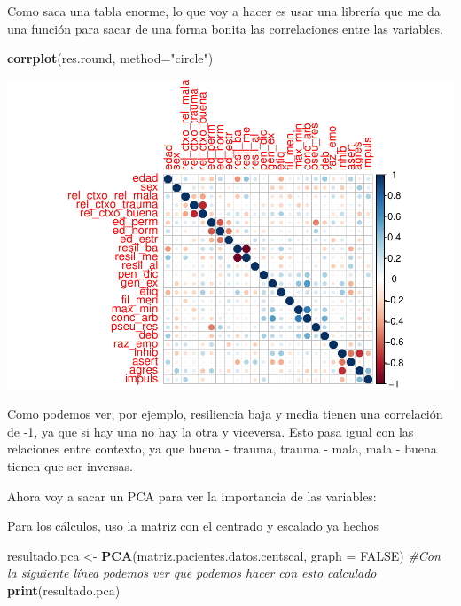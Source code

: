 \documentclass[]{article}
\newenvironment{Shaded}{\begin{snugshade}}{\end{snugshade}}
\newcommand{\KeywordTok}[1]{\textcolor[rgb]{0.13,0.29,0.53}{\textbf{#1}}}
\newcommand{\DataTypeTok}[1]{\textcolor[rgb]{0.13,0.29,0.53}{#1}}
\newcommand{\StringTok}[1]{\textcolor[rgb]{0.31,0.60,0.02}{#1}}
\newcommand{\CommentTok}[1]{\textcolor[rgb]{0.56,0.35,0.01}{\textit{#1}}}
\newcommand{\OtherTok}[1]{\textcolor[rgb]{0.56,0.35,0.01}{#1}}
\newcommand{\NormalTok}[1]{#1}
\begin{document}
Como saca una tabla enorme, lo que voy a hacer es usar una librería que
me da una función para sacar de una forma bonita las correlaciones entre
las variables.

\begin{Shaded}
\begin{Highlighting}[]
\KeywordTok{corrplot}\NormalTok{(res.round, }\DataTypeTok{method=}\StringTok{"circle"}\NormalTok{)}
\end{Highlighting}
\end{Shaded}

\includegraphics{codigo_files/figure-latex/grafico_correlaciones_variables-1.pdf}

Como podemos ver, por ejemplo, resiliencia baja y media tienen una
correlación de -1, ya que si hay una no hay la otra y viceversa. Esto
pasa igual con las relaciones entre contexto, ya que buena - trauma,
trauma - mala, mala - buena tienen que ser inversas.

Ahora voy a sacar un PCA para ver la importancia de las variables:

Para los cálculos, uso la matriz con el centrado y escalado ya hechos

\begin{Shaded}
\begin{Highlighting}[]
\NormalTok{resultado.pca <-}\StringTok{ }\KeywordTok{PCA}\NormalTok{(matriz.pacientes.datos.centscal, }\DataTypeTok{graph =} \OtherTok{FALSE}\NormalTok{)}
\CommentTok{#Con la siguiente línea podemos ver que podemos hacer con esto calculado}
\KeywordTok{print}\NormalTok{(resultado.pca)}
\end{Highlighting}
\end{Shaded}
\end{document}
